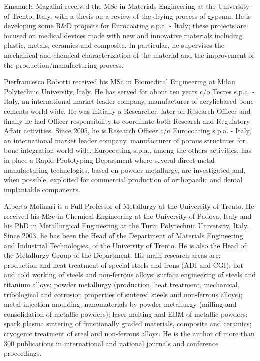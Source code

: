 \documentclass[10pt]{article}
\begin{document}
Emanuele Magalini received the MSc in Materials Engineering at the University of Trento, Italy, with a thesis on a review of the drying process of gypsum. He is developing some R\&D projects for Eurocoating s.p.a. - Italy; these projects are focused on medical devices made with new and innovative materials including plastic, metals, ceramics and composite. In particular, he supervises the mechanical and chemical characterization of the material and the improvement of the production/manufacturing process.

Pierfrancesco Robotti received his MSc in Biomedical Engineering at Milan Polytechnic University, Italy. $\mathrm{He}$ has served for about ten years c/o Tecres s.p.a. - Italy, an international market leader company, manufacturer of acrylicbased bone cements world wide. He was initially a Researcher, later on Research Officer and finally he had Officer responsibility to coordinate both Research and Regulatory Affair activities. Since 2005, he is Research Officer c/o Eurocoating s.p.a. - Italy, an international market leader company, manufacturer of porous structures for bone integration world wide. Eurocoating s.p.a., among the others activities, has in place a Rapid Prototyping Department where several direct metal manufacturing technologies, based on powder metallurgy, are investigated and, when possible, exploited for commercial production of orthopaedic and dental implantable components.

Alberto Molinari is a Full Professor of Metallurgy at the University of Trento. He received his MSc in Chemical Engineering at the University of Padova, Italy and his PhD in Metallurgical Engineering at the Turin Polytechnic University, Italy. Since 2003, he has been the Head of the Department of Materials Engineering and Industrial Technologies, of the University of Trento. He is also the Head of the Metallurgy Group of the Department. His main research areas are: production and heat treatment of special steels and irons (ADI and CGI); hot and cold working of steels and non-ferrous alloys; surface engineering of steels and titanium alloys; powder metallurgy (production, heat treatment, mechanical, tribological and corrosion properties of sintered steels and non-ferrous alloys); metal injection moulding; nanomaterials by powder metallurgy (milling and consolidation of metallic powders); laser melting and EBM of metallic powders; spark plasma sintering of functionally graded materials, composite and ceramics; cryogenic treatment of steel and non-ferrous alloys. He is the author of more than 300 publications in international and national journals and conference proceedings.
\end{document}
